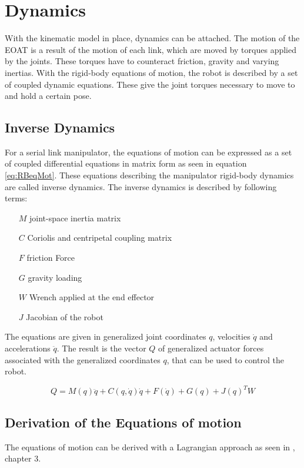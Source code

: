 \section{Dynamics}

With the kinematic model in place, dynamics can be attached. The motion of the \ac{EOAT} is a result of the motion of each link, which are moved by torques applied by the joints. These torques have to counteract friction, gravity and varying inertias.
With the rigid-body equations of motion, the robot is described by a set of coupled dynamic equations. These give the joint torques necessary to move to and hold a certain pose.

\subsection{Inverse Dynamics}

For a serial link manipulator, the equations of motion can be expressed as a set of coupled differential equations in matrix form as seen in equation \ref{eq:RBeqMot}. These equations describing the manipulator rigid-body dynamics are called inverse dynamics.
The inverse dynamics is described by following terms:
\begin{itemize}
	\item[$ M $] joint-space inertia matrix
	\item[$ C $] Coriolis and centripetal coupling matrix
	\item[$ F $] friction Force
	\item[$ G $] gravity loading
	\item[$ W $] Wrench applied at the end effector
	\item[$ J $] Jacobian of the robot
\end{itemize}
The equations are given in generalized joint coordinates $q$, velocities $\dot{q}$ and accelerations $\ddot{q}$.
The result is the vector $Q$ of generalized actuator forces associated with the generalized coordinates $ q$, that can be used to control the robot.

\begin{equation}\label{eq:RBeqMot}
	Q=M(q)\ddot{q}+C(q,\dot{q})\dot{q}+F(\dot{q})+G(q)+J(q)^TW
\end{equation}


\subsection{Derivation of the Equations of motion}
The equations of motion can be derived with a Lagrangian approach as seen in \cite{MathIntroRobManip}, chapter 3.


